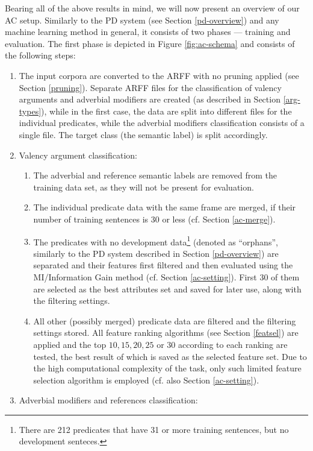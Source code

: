 \documentclass[12pt,notitlepage]{report}
\begin{document}
Bearing all of the above results in mind, we will now present an overview of our AC setup. Similarly to the PD system (see Section \ref{pd-overview}) and any machine learning method in general, it consists of two phases --- training and evaluation. The first phase is depicted in Figure \ref{fig:ac-schema} and consists of the following steps:
\begin{enumerate}
    \item The input corpora are converted to the ARFF with no pruning applied (see Section \ref{pruning}). Separate ARFF files for the classification of valency arguments and adverbial modifiers are created (as described in Section \ref{arg-types}), while in the first case, the data are split into different files for the individual predicates, while the adverbial modifiers classification consists of a single file. The target class (the semantic label) is split accordingly.
    \item Valency argument classification:
    \begin{enumerate}
        \item The adverbial and reference semantic labels are removed from the training data set, as they will not be present for evaluation.
        \item The individual predicate data with the same frame are merged, if their number of training sentences is 30 or less (cf. Section \ref{ac-merge}).
        \item The predicates with no development data\footnote{There are 212 predicates that have 31 or more training sentences, but no development senteces.} (denoted as ``orphans'', similarly to the PD system described in Section \ref{pd-overview}) are separated and their features first filtered and then evaluated using the MI/Information Gain method (cf. Section \ref{ac-setting}). First 30 of them are selected as the best attributes set and saved for later use, along with the filtering settings.
        \item All other (possibly merged) predicate data are filtered and the filtering settings stored. All feature ranking algorithms (see Section \ref{featsel}) are applied and the top $10,15,20,25$ or $30$ according to each ranking are tested, the best result of which is saved as the selected feature set. Due to the high computational complexity of the task, only such limited feature selection algorithm is employed (cf. also Section \ref{ac-setting}).
    \end{enumerate}
    \item Adverbial modifiers and references classification:

\end{enumerate}
\end{document}
